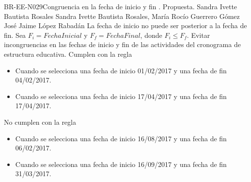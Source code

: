 \begin{BusinessRule}{BR-EE-N029}{Congruencia en la fecha de inicio y fin}
	{\bcIntegridad}    %
	{\btEnabler}     %
	{\blControlling}    %
	.
	\BRItem[Estado] Propuesta.
	 Sandra Ivette Bautista Rosales
	 Sandra Ivette Bautista Rosales, María Rocío Guerrero Gómez
	 José Jaime López Rabadán
	\BRItem[Descripción] La fecha de inicio no puede ser posterior a la fecha de fin.
	\BRItem[Sentencia] Sea $F_i = Fecha Inicial$ y $F_f = Fecha Final$, donde $F_i\leq F_f$.
	\BRItem[Motivación] Evitar incongruencias en las fechas de inicio y fin de las actividades del cronograma de estructura educativa.
	 Cumplen con la regla
	\begin{itemize}
		\item Cuando se selecciona una fecha de inicio 01/02/2017 y una fecha de fin 04/02/2017.
		\item Cuando se selecciona una fecha de inicio 17/04/2017 y una fecha de fin 17/04/2017.
	\end{itemize}
	 No cumplen con la regla
	\begin{itemize}
		\item Cuando se selecciona una fecha de inicio 16/08/2017 y una fecha de fin 06/02/2017.
		\item Cuando se selecciona una fecha de inicio 16/09/2017 y una fecha de fin 31/03/2017.
	\end{itemize}
\end{BusinessRule}


